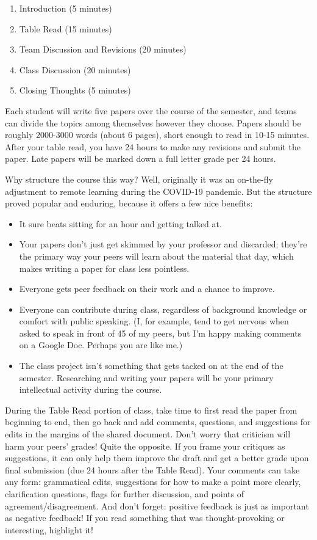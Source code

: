 \documentclass[11pt, letterpaper]{article}
\begin{document}
\begin{enumerate}
\item Introduction (5 minutes)
\item Table Read (15 minutes)
\item Team Discussion and Revisions (20 minutes)
\item Class Discussion (20 minutes)
\item Closing Thoughts (5 minutes)
\end{enumerate}

Each student will write five papers over the course of the semester, and teams can divide the topics among themselves however they choose. Papers should be roughly 2000-3000 words (about 6 pages), short enough to read in 10-15 minutes. After your table read, you have 24 hours to make any revisions and submit the paper. Late papers will be marked down a full letter grade per 24 hours.
 
Why structure the course this way? Well, originally it was an on-the-fly adjustment to remote learning during the COVID-19 pandemic. But the structure proved popular and enduring, because it offers a few nice benefits:

\begin{itemize}
	\item It sure beats sitting for an hour and getting talked at.
	\item Your papers don't just get skimmed by your professor and discarded; they're the primary way your peers will learn about the material that day, which makes writing a paper for class less pointless.
	\item Everyone gets peer feedback on their work and a chance to improve.
	\item Everyone can contribute during class, regardless of background knowledge or comfort with public speaking. (I, for example, tend to get nervous when asked to speak in front of 45 of my peers, but I’m happy making comments on a Google Doc. Perhaps you are like me.)
	\item The class project isn't something that gets tacked on at the end of the semester. Researching and writing your papers will be your primary intellectual activity during the course.
\end{itemize}

\noindent During the Table Read portion of class, take time to first read the paper from beginning to end, then go back and add comments, questions, and suggestions for edits in the margins of the shared document. Don't worry that criticism will harm your peers' grades! Quite the opposite. If you frame your critiques as suggestions, it can only help them improve the draft and get a better grade upon final submission (due 24 hours after the Table Read). Your comments can take any form: grammatical edits, suggestions for how to make a point more clearly, clarification questions, flags for further discussion, and points of agreement/disagreement. And don't forget: positive feedback is just as important as negative feedback! If you read something that was thought-provoking or interesting, highlight it!
\end{document}
